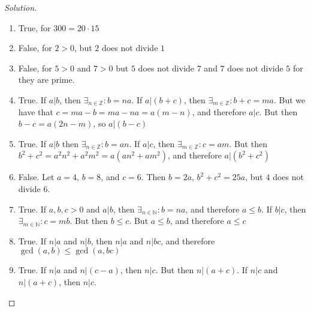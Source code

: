 \documentclass[crop=false,class=book,oneside]{standalone}                      %
\begin{document}
            \begin{proof}[Solution]
                \
                \begin{enumerate}
                    \item True, for $300=20\cdot 15$
                    \item False, for $2>0$, but $2$ does not divide
                        $1$
                    \item False, for $5>0$ and $7>0$ but $5$ does
                        not divide $7$ and $7$ does not
                        divide $5$ for they are prime.
                    \item True. If ${a}\vert{b}$, then
                        $\exists_{n\in\mathbb{Z}}:b=na$. If
                        ${a}\vert{(b+c)}$, then
                        $\exists_{m\in\mathbb{Z}}:b+c=ma$. But we
                        have that $c=ma-b=ma-na=a(m-n)$,
                        and therefore ${a}\vert{c}$. But then
                        $b-c=a(2n-m)$, so ${a}\vert{(b-c)}$
                    \item True. If ${a}\vert{b}$ then
                        $\exists_{n\in\mathbb{Z}}:b=an$.
                        If ${a}\vert{c}$, then
                        $\exists_{m\in\mathbb{Z}}:c=am$. But then
                        $b^{2}+c^{2}=a^{2}n^{2}+a^{2}m^{2}%
                         =a(an^{2}+am^{2})$, and therefore
                        ${a}\vert{(b^{2}+c^{2})}$
                    \item False. Let $a=4$, $b=8$, and $c=6$.
                        Then $b=2a$, $b^{2}+c^{2}=25a$, but $4$
                        does not divide $6$.
                    \item True. If $a,b,c>0$ and ${a}\vert{b}$,
                        then $\exists_{n\in\mathbb{N}}:b=na$,
                        and therefore $a\leq b$. If
                        ${b}\vert{c}$, then
                        $\exists_{m\in\mathbb{N}}:c=mb$. But then
                        $b\leq c$. But $a\leq b$, and therefore
                        $a\leq c$
                    \item True. If ${n}\vert{a}$ and ${n}\vert{b}$,
                        then ${n}\vert{a}$ and ${n}\vert{bc}$, and
                        therefore $\gcd(a,b)\leq\gcd(a,bc)$
                    \item True. If ${n}\vert{a}$ and
                        ${n}\vert{(c-a)}$, then ${n}\vert{c}$. But
                        then ${n}\vert{(a+c)}$. If ${n}\vert{c}$
                        and ${n}\vert{(a+c)}$, then ${n}\vert{c}$.

\end{enumerate}
\end{proof}
\end{document}

